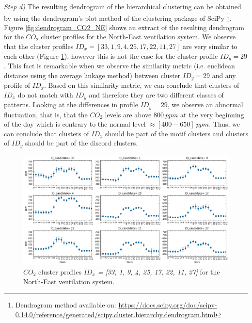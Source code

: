 \textit{Step d)} The resulting dendrogram of the hierarchical clustering can be obtained by using the dendrogram's plot method of the clustering package of SciPy \footnote{Dendrogram method available on: \url{https://docs.scipy.org/doc/scipy-0.14.0/reference/generated/scipy.cluster.hierarchy.dendrogram.html}}. Figure \ref{fig:dendrogram_CO2_NE} shows an extract of the resulting dendrogram for the $CO_2$ cluster profiles for the North-East ventilation system. We observe that the cluster profiles $ID_x = [33, 1, 9, 4, 25, 17, 22, 11, 27]$ are very similar to each other (Figure \ref{fig:CO2_candidates_comparison}), however this is not the case for the cluster profile $ID_y=29$. This fact is remarkable when we observe the similarity metric (i.e. euclidean distance using the average linkage method) between cluster $ID_y=29$ and any profile of $ID_x$. Based on this similarity metric, we can conclude that clusters of $ID_x$ do not match with $ID_y$ and therefore they are two different classes of patterns. Looking at the differences in profile $ID_y = 29$, we observe an abnormal fluctuation, that is, that the $CO_2$ levels are above $800 \ ppm$ at the very beginning of the day  which is contrary to the normal level $\approx [400 - 650] \ ppm$. Thus, we can conclude that clusters of $ID_x$ should be part of the motif clusters and clusters of $ID_y$ should be part of the discord clusters. 

\begin{figure}[h!]
  \vspace{0.5em} %
  \includegraphics[scale=0.5]{Figures/CO2_candidates_comparison.jpg}
  \caption{$CO_2$ cluster profiles \textit{$ID_x$ = [33, 1, 9, 4, 25, 17, 22, 11, 27]} for the North-East ventilation system.}
  \label{fig:CO2_candidates_comparison}
\end{figure}  

